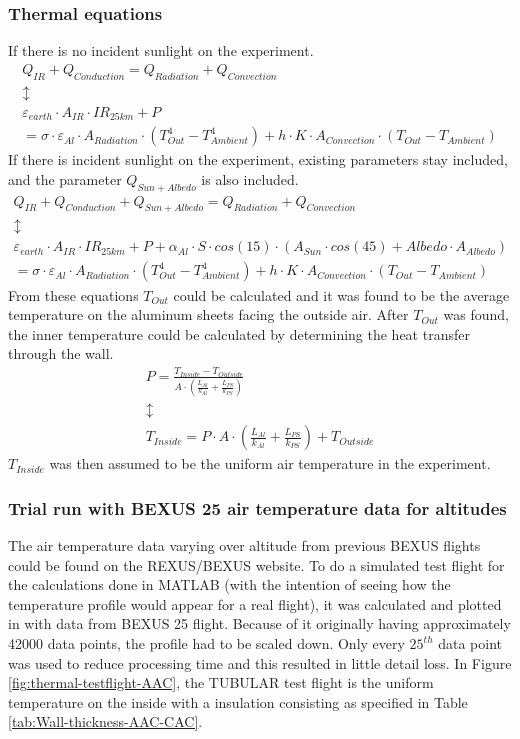 \subsubsection{Thermal equations}
If there is no incident sunlight on the experiment.
\begin{gather*}
    Q_{IR} + Q_{Conduction} = Q_{Radiation} + Q_{Convection} \\
    \updownarrow \\
    \varepsilon_{earth} \cdot A_{IR} \cdot IR_{25km} + P \\ = \sigma \cdot \varepsilon_{Al} \cdot A_{Radiation} \cdot (T_{Out}^4 - T_{Ambient}^4 ) + h \cdot K \cdot A_{Convection} \cdot (T_{Out} - T_{Ambient})
\end{gather*}
If there is incident sunlight on the experiment, existing parameters stay included, and the parameter $Q_{Sun+Albedo}$ is also included.
\begin{gather*}
    Q_{IR} + Q_{Conduction} + Q_{Sun+Albedo} = Q_{Radiation} + Q_{Convection} \\
    \updownarrow \\
    \varepsilon_{earth} \cdot A_{IR} \cdot IR_{25km} + P + \alpha_{Al}\cdot S \cdot cos(15) \cdot (A_{Sun} \cdot cos(45) + Albedo \cdot A_{Albedo}) \\ = \sigma \cdot \varepsilon_{Al} \cdot A_{Radiation} \cdot (T_{Out}^4 - T_{Ambient}^4 ) + h \cdot K \cdot A_{Convection} \cdot (T_{Out} - T_{Ambient})
\end{gather*}
From these equations $T_{Out}$ could be calculated and it was found to be the average temperature on the aluminum sheets facing the outside air.
After $T_{Out}$ was found, the inner temperature could be calculated by determining the heat transfer through the wall.
\begin{gather*}
    P = \frac{T_{Inside} - T_{Outside}}{A \cdot (\frac{L_{Al}}{k_{Al}} + \frac{L_{PS}}{k_{PS}})} \\
     \updownarrow \\
    T_{Inside} = P \cdot A \cdot (\frac{L_{Al}}{k_{Al}} + \frac{L_{PS}}{k_{PS}}) + T_{Outside}
\end{gather*}
$T_{Inside}$ was then assumed to be the uniform air temperature in the experiment.



\subsubsection{Trial run with BEXUS 25 air temperature data for altitudes}
The air temperature data varying over altitude from previous BEXUS flights could be found on the REXUS/BEXUS website. To do a simulated test flight for the calculations done in MATLAB (with the intention of seeing how the temperature profile would appear for a real flight), it was calculated and plotted in with data from BEXUS 25 flight.
Because of it originally having approximately 42000 data points, the profile had to be scaled down. Only every $25^{th}$ data point was used to reduce processing time and this resulted in little detail loss. In Figure \ref{fig:thermal-testflight-AAC}, the TUBULAR test flight is the uniform temperature on the inside with a insulation consisting as specified in Table \ref{tab:Wall-thickness-AAC-CAC}.

